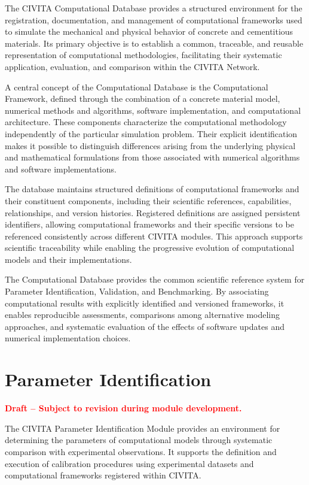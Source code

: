The CIVITA Computational Database provides a structured environment for the registration, documentation, and management of computational frameworks used to simulate the mechanical and physical behavior of concrete and cementitious materials. Its primary objective is to establish a common, traceable, and reusable representation of computational methodologies, facilitating their systematic application, evaluation, and comparison within the CIVITA Network.

A central concept of the Computational Database is the Computational Framework, defined through the combination of a concrete material model, numerical methods and algorithms, software implementation, and computational architecture. These components characterize the computational methodology independently of the particular simulation problem. Their explicit identification makes it possible to distinguish differences arising from the underlying physical and mathematical formulations from those associated with numerical algorithms and software implementations.

The database maintains structured definitions of computational frameworks and their constituent components, including their scientific references, capabilities, relationships, and version histories. Registered definitions are assigned persistent identifiers, allowing computational frameworks and their specific versions to be referenced consistently across different CIVITA modules. This approach supports scientific traceability while enabling the progressive evolution of computational models and their implementations.

The Computational Database provides the common scientific reference system for Parameter Identification, Validation, and Benchmarking. By associating computational results with explicitly identified and versioned frameworks, it enables reproducible assessments, comparisons among alternative modeling approaches, and systematic evaluation of the effects of software updates and numerical implementation choices.


\section{Parameter Identification}
\label{sec:civita-parameter-identification}

\noindent\textcolor{red}{\textbf{Draft -- Subject to revision during module development.}}

The CIVITA Parameter Identification Module provides an environment for determining the parameters of computational models through systematic comparison with experimental observations. It supports the definition and execution of calibration procedures using experimental datasets and computational frameworks registered within CIVITA.

